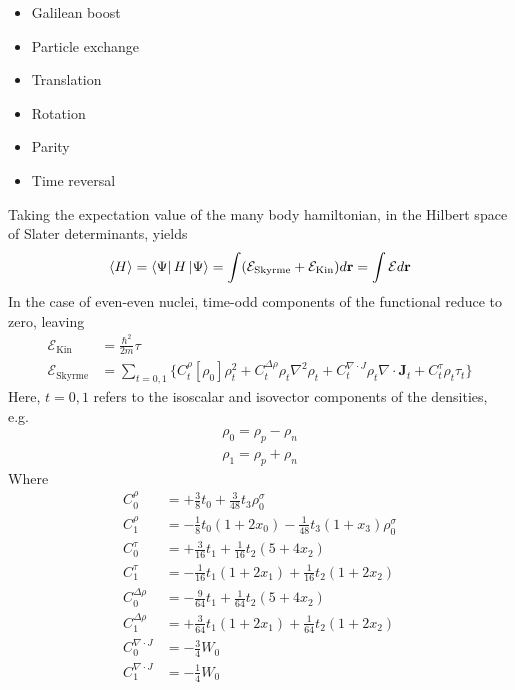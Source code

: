 \begin{itemize}
    \item Galilean boost
    \item Particle exchange
    \item Translation
    \item Rotation
    \item Parity
    \item Time reversal
\end{itemize}
Taking the expectation value of the many body hamiltonian, in the Hilbert space of Slater determinants, yields
\begin{equation}
    \label{eq:slater_exp}
    \expval{H} = \bra{\Psi} H \ket{\Psi} = \int (\mathcal E_\text{Skyrme} + \mathcal E_\text{Kin}) d\mathbf r = \int \mathcal E d\mathbf r
\end{equation}
In the case of even-even nuclei, time-odd components of the functional reduce to zero, leaving \cite{stevenson2019low}
\begin{align}
    \mathcal E_\text{Kin} &= \frac{\hbar^2}{2m}\tau \label{eq:kinfunc}\\
    \mathcal E_\text{Skyrme} &= \sum_{t=0,1}\bigg\{C_t^\rho [\rho_0]\rho_t^2+C_t^{\Delta \rho}\rho_t\nabla^2\rho_t+C_t^{\nabla\cdot J}\rho_t\nabla\cdot \mathbf J_t + C_t^\tau\rho_t\tau_t\bigg\}\label{eq:skfunc}
\end{align}
Here, $t=0,1$ refers to the isoscalar and isovector components of the densities, e.g.
\begin{align*}
    \rho_0 = \rho_p - \rho_n
    \\\rho_1 = \rho_p + \rho_n
\end{align*}
Where
\begin{align}
    \label{eq:coefficients_func}
    C_0^\rho &= +\frac 3 8 t_0 + \frac 3 {48} t_3\rho_0^\sigma 
    \\C_1^\rho &= -\frac 1 8 t_0(1+2x_0)- \frac 1 {48} t_3(1+x_3)\rho_0^\sigma 
    \\C_0^\tau &= +\frac 3 {16} t_1 + \frac 1 {16} t_2 (5+4x_2)
    \\C_1^\tau &= -\frac 1 {16} t_1(1+2x_1)+\frac 1 {16}t_2(1+2x_2)
    \\C_0^{\Delta \rho} &= -\frac 9 {64}t_1+\frac 1 {64}t_2(5+4x_2)
    \\C_1^{\Delta \rho} &= +\frac 3 {64}t_1(1+2x_1)+\frac 1 {64}t_2(1+2x_2)
    \\C_0^{\nabla\cdot J} &= -\frac 3 4 W_0
    \\C_1^{\nabla\cdot J} &= -\frac 1 4 W_0
\end{align}
